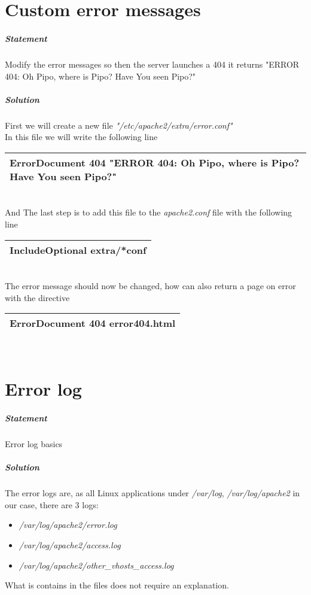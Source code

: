 \documentclass[a4paper,10pt]{article}
\begin{document}
\section{Custom error messages}
\subparagraph{Statement}
Modify the error messages so then the server launches a 404 it returns "ERROR 404: Oh Pipo, where is Pipo? Have You seen Pipo?"
\subparagraph{Solution}
First we will create a new file {\it "/etc/apache2/extra/error.conf"}\\
In this file we will write the following line
\vspace{0.5cm}\\\begin{tabular}{|l|}\hline
ErrorDocument 404 "ERROR 404: Oh Pipo, where is Pipo? Have You seen Pipo?"
\\\hline\end{tabular}\vspace{0.5cm}\\
And The last step is to add this file to the {\it apache2.conf} file with the following line
\vspace{0.5cm}\\\begin{tabular}{|l|}\hline
IncludeOptional extra/*conf
\\\hline\end{tabular}\vspace{0.5cm}\\
The error message should now be changed, how can also return a page on error with the directive
\vspace{0.5cm}\\\begin{tabular}{|l|}\hline
ErrorDocument 404 error404.html
\\\hline\end{tabular}\vspace{0.5cm}\\

\section{Error log}
\subparagraph{Statement}
Error log basics
\subparagraph{Solution}
The error logs are, as all Linux applications under {\it /var/log}, {\it /var/log/apache2} in our case, there are 3 logs:
\begin{itemize}
  \item {\it /var/log/apache2/error.log}
  \item {\it /var/log/apache2/access.log}
  \item {\it /var/log/apache2/other\_vhosts\_access.log}
\end{itemize}
What is contains in the files does not require an explanation.
\pagebreak
\end{document}
